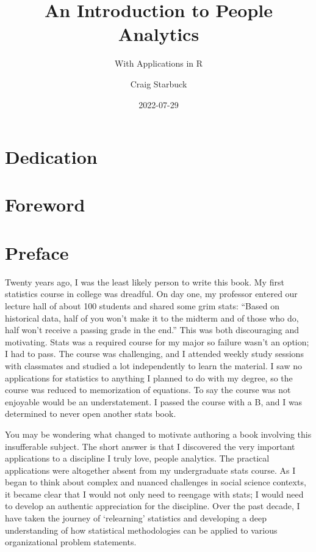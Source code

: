 \documentclass[
]{book}
\title{An Introduction to People Analytics}
\subtitle{With Applications in R}
\author{Craig Starbuck}
\date{2022-07-29}
\begin{document}
\maketitle

{
\setcounter{tocdepth}{1}
\tableofcontents
}
\hypertarget{dedication}{%
\chapter*{Dedication}\label{dedication}}

\hypertarget{foreword}{%
\chapter*{Foreword}\label{foreword}}

\hypertarget{preface}{%
\chapter*{Preface}\label{preface}}

Twenty years ago, I was the least likely person to write this book. My first statistics course in college was dreadful. On day one, my professor entered our lecture hall of about 100 students and shared some grim stats: ``Based on historical data, half of you won't make it to the midterm and of those who do, half won't receive a passing grade in the end.'' This was both discouraging and motivating. Stats was a required course for my major so failure wasn't an option; I had to pass. The course was challenging, and I attended weekly study sessions with classmates and studied a lot independently to learn the material. I saw no applications for statistics to anything I planned to do with my degree, so the course was reduced to memorization of equations. To say the course was not enjoyable would be an understatement. I passed the course with a B, and I was determined to never open another stats book.

You may be wondering what changed to motivate authoring a book involving this insufferable subject. The short answer is that I discovered the very important applications to a discipline I truly love, people analytics. The practical applications were altogether absent from my undergraduate stats course. As I began to think about complex and nuanced challenges in social science contexts, it became clear that I would not only need to reengage with stats; I would need to develop an authentic appreciation for the discipline. Over the past decade, I have taken the journey of `relearning' statistics and developing a deep understanding of how statistical methodologies can be applied to various organizational problem statements.
\end{document}
